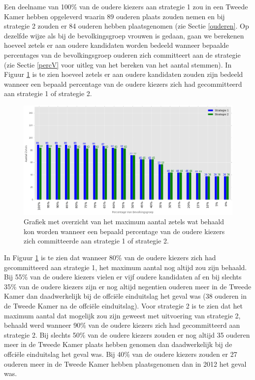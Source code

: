 \newpage

\indent Een deelname van 100\% van de oudere kiezers aan strategie 1 zou in een Tweede Kamer hebben opgeleverd waarin 89 ouderen plaats zouden nemen en bij strategie 2 zouden er 84 ouderen hebben plaatsgenomen (zie Sectie \ref{ouderen}. Op dezelfde wijze als bij de bevolkingsgroep vrouwen is gedaan, gaan we berekenen hoeveel zetels er aan oudere kandidaten worden bedeeld wanneer bepaalde percentages van de bevolkingsgroep ouderen zich committeert aan de strategie (zie Sectie \ref{percV} voor uitleg van het bereken van het aantal stemmen). In Figuur \ref{fig:PerO} is te zien hoeveel zetels er aan oudere kandidaten zouden zijn bedeeld wanneer een bepaald percentage van de oudere kiezers zich had gecommitteerd aan strategie 1 of strategie 2.  



\begin{figure}[H]
	\includegraphics[width=\linewidth]{percentages_van_ouderenS1S2.png}

			\caption{Grafiek met overzicht van het maximum aantal zetels wat behaald kon worden wanneer een bepaald percentage van de oudere kiezers zich committeerde aan strategie 1 of strategie 2.}

\label{fig:PerO}
\end{figure}

In Figuur \ref{fig:PerO} is te zien dat wanneer 80\% van de oudere kiezers zich had gecommitteerd aan strategie 1, het maximum aantal nog altijd zou zijn behaald. Bij 55\% van de oudere kiezers vielen er vijf oudere kandidaten af en bij slechts 35\% van de oudere kiezers zijn er nog altijd negentien ouderen meer in de Tweede Kamer dan daadwerkelijk bij de offci\"{e}le einduitslag het geval was (38 ouderen in de Tweede Kamer na de offci\"{e}le einduitslag). Voor strategie 2 is te zien dat het maximum aantal dat mogelijk zou zijn geweest met uitvoering van strategie 2, behaald werd wanneer 90\% van de oudere kiezers zich had gecommitteerd aan strategie 2. Bij slechts 50\% van de oudere kiezers zouden er nog altijd 35 ouderen meer in de Tweede Kamer plaats hebben genomen dan daadwerkelijk bij de offci\"{e}le einduitslag het geval was. Bij 40\% van de oudere kiezers zouden er 27 ouderen meer in de Tweede Kamer hebben plaatsgenomen dan in 2012 het geval was.



